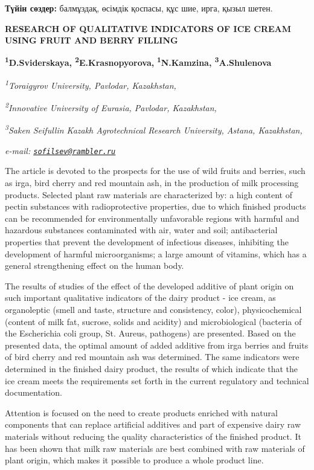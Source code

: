 {{{\bfseries Түйін сөздер:} балмұздақ, өсімдік қоспасы, құс шие, ирга, қызыл
шетен.

{\bfseries RESEARCH OF QUALITATIVE INDICATORS OF ICE CREAM USING FRUIT AND
BERRY FILLING}

{\bfseries \textsuperscript{1}D.Sviderskaya\textsuperscript{\envelope },
\textsuperscript{2}E.Krasnopyorova,}
{\bfseries \textsuperscript{1}N.Kamzina, \textsuperscript{3}A.Shulenova}

\emph{\textsuperscript{1}Toraigyrov University, Pavlodar, Kazakhstan,}

\emph{\textsuperscript{2}Innovative University of Eurasia, Pavlodar,
Kazakhstan,}

\emph{\textsuperscript{3}Saken Seifullin Kazakh Agrotechnical Research
University, Astana, Kazakhstan,}

\emph{e-mail:
\href{mailto:sofilsev@rambler.ru}{\nolinkurl{sofilsev@rambler.ru}}}

The article is devoted to the prospects for the use of wild fruits and
berries, such as irga, bird cherry and red mountain ash, in the
production of milk processing products. Selected plant raw materials are
characterized by: a high content of pectin substances with
radioprotective properties, due to which finished products can be
recommended for environmentally unfavorable regions with harmful and
hazardous substances contaminated with air, water and soil;
antibacterial properties that prevent the development of infectious
diseases, inhibiting the development of harmful microorganisms; a large
amount of vitamins, which has a general strengthening effect on the
human body.

The results of studies of the effect of the developed additive of plant
origin on such important qualitative indicators of the dairy product -
ice cream, as organoleptic (smell and taste, structure and consistency,
color), physicochemical (content of milk fat, sucrose, solids and
acidity) and microbiological (bacteria of the Escherichia coli group,
St. Aureus, pathogens) are presented. Based on the presented data, the
optimal amount of added additive from irga berries and fruits of bird
cherry and red mountain ash was determined. The same indicators were
determined in the finished dairy product, the results of which indicate
that the ice cream meets the requirements set forth in the current
regulatory and technical documentation.

Attention is focused on the need to create products enriched with
natural components that can replace artificial additives and part of
expensive dairy raw materials without reducing the quality
characteristics of the finished product. It has been shown that milk raw
materials are best combined with raw materials of plant origin, which
makes it possible to produce a whole product line.

}}
